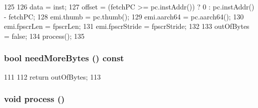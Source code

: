 \begin{DoxyCode}
125 {
126     data = inst;
127     offset = (fetchPC >= pc.instAddr()) ? 0 : pc.instAddr() - fetchPC;
128     emi.thumb = pc.thumb();
129     emi.aarch64 = pc.aarch64();
130     emi.fpscrLen = fpscrLen;
131     emi.fpscrStride = fpscrStride;
132 
133     outOfBytes = false;
134     process();
135 }
\end{DoxyCode}
\hypertarget{classArmISA_1_1Decoder_ac858279e4cc89d892ea4cb6b42853d88}{
\subsubsection[{needMoreBytes}]{\setlength{\rightskip}{0pt plus 5cm}bool needMoreBytes () const}}
\label{classArmISA_1_1Decoder_ac858279e4cc89d892ea4cb6b42853d88}



\begin{DoxyCode}
111     {
112         return outOfBytes;
113     }
\end{DoxyCode}
\hypertarget{classArmISA_1_1Decoder_a2e9c5136d19b1a95fc427e0852deab5c}{
\subsubsection[{process}]{\setlength{\rightskip}{0pt plus 5cm}void process ()}}
\label{classArmISA_1_1Decoder_a2e9c5136d19b1a95fc427e0852deab5c}



